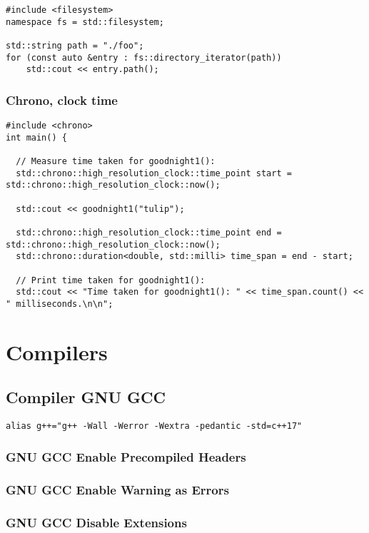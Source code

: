 \begin{verbatim}
#include <filesystem>
namespace fs = std::filesystem;

std::string path = "./foo";
for (const auto &entry : fs::directory_iterator(path))
    std::cout << entry.path();
\end{verbatim}

\subsection{Chrono, clock time}

\begin{verbatim}
#include <chrono>
int main() {

  // Measure time taken for goodnight1():
  std::chrono::high_resolution_clock::time_point start = std::chrono::high_resolution_clock::now();

  std::cout << goodnight1("tulip");

  std::chrono::high_resolution_clock::time_point end = std::chrono::high_resolution_clock::now();
  std::chrono::duration<double, std::milli> time_span = end - start;

  // Print time taken for goodnight1():
  std::cout << "Time taken for goodnight1(): " << time_span.count() << " milliseconds.\n\n";
\end{verbatim}

\chapter{Compilers}

\section{Compiler GNU GCC}

\begin{verbatim}
alias g++="g++ -Wall -Werror -Wextra -pedantic -std=c++17"
\end{verbatim}

\subsection{GNU GCC Enable Precompiled Headers}
\subsection{GNU GCC Enable Warning as Errors}
\subsection{GNU GCC Disable Extensions}


